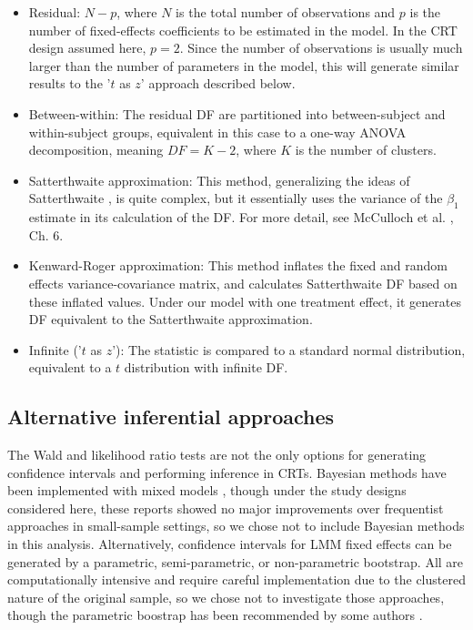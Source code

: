\documentclass[twocolumn]{bmcart}%
\begin{document}
\begin{itemize}
  \item Residual: $N - p$, where $N$ is the total number of observations and $p$ is the number of fixed-effects coefficients to be estimated in the model. In the CRT design assumed here, $p=2$. Since the number of observations is usually much larger than the number of parameters in the model, this will generate similar results to the '$t$ as $z$' approach described below.
  \item Between-within: The residual DF are partitioned into between-subject and within-subject groups, equivalent in this case to a one-way ANOVA decomposition, meaning $DF = K-2$, where $K$ is the number of clusters.
  \item Satterthwaite approximation: This method, generalizing the ideas of Satterthwaite \cite{satterthwaite_approximate_1946}, is quite complex, but it essentially uses the variance of the $\beta_1$ estimate in its calculation of the DF. For more detail, see McCulloch et al. \cite{mcculloch_generalized_2008}, Ch. 6.
  \item Kenward-Roger approximation: This method \cite{kenward_small_1997} inflates the fixed and random effects variance-covariance matrix, and calculates Satterthwaite DF based on these inflated values. Under our model with one treatment effect, it generates DF equivalent to the Satterthwaite approximation.
  \item Infinite ('$t$ as $z$'): The statistic is compared to a standard normal distribution, equivalent to a $t$ distribution with infinite DF.
\end{itemize}

\subsection*{Alternative inferential approaches}

The Wald and likelihood ratio tests are not the only options for generating confidence intervals and performing inference in CRTs. Bayesian methods have been implemented with mixed models \cite{browne_comparison_2006, baldwin_bayesian_2013}, though under the study designs considered here, these reports showed no major improvements over frequentist approaches in small-sample settings, so we chose not to include Bayesian methods in this analysis. Alternatively, confidence intervals for LMM fixed effects can be generated by a parametric, semi-parametric, or non-parametric bootstrap. All are computationally intensive and require careful implementation due to the clustered nature of the original sample, so we chose not to investigate those approaches, though the parametric boostrap has been recommended by some authors \cite{ukyo_improved_2019}.
\end{document}
